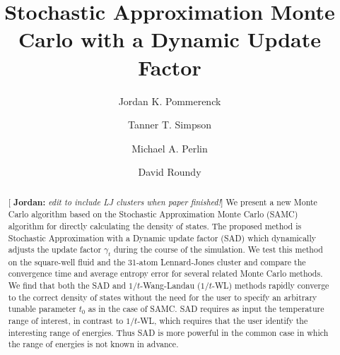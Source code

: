 \documentclass[letterpaper,twocolumn,amsmath,amssymb,pre,aps,10pt]{revtex4-1}
\newcommand{\blue}[1]{{\bf \color{blue} #1}}
\newcommand{\jpsays}[1]{{\color{red} [\blue{Jordan:} \emph{#1}]}}
\begin{document}
\title{Stochastic Approximation Monte Carlo with a Dynamic Update
Factor
}

\author{Jordan K. Pommerenck} \author{Tanner T. Simpson}
\author{Michael A. Perlin} \author{David Roundy}

\begin{abstract}
  \jpsays{edit to include LJ clusters when paper finished!}
  We present a new Monte Carlo algorithm based on the Stochastic
  Approximation Monte Carlo (SAMC) algorithm for directly calculating
  the density of states. The proposed method is Stochastic
  Approximation with a Dynamic update factor (SAD)
  which dynamically adjusts the update factor $\gamma_t$ during the course of
  the simulation. We test this method on the square-well fluid and
  the 31-atom Lennard-Jones cluster and
  compare the convergence time and average entropy error for several
  related
  Monte Carlo methods. We find that both the SAD and $1/t$-Wang-Landau ($1/t$-WL)
  methods rapidly converge to the
  correct density of states without the need for the user to specify an
  arbitrary tunable parameter $t_0$ as in the case of SAMC.  SAD requires
  as input the temperature range of interest, in contrast to
  $1/t$-WL, which requires that the user identify the interesting range
  of energies.  Thus SAD is more powerful in the common case in which the range
  of energies is not known in advance.
\end{abstract}

\maketitle
\end{document}
